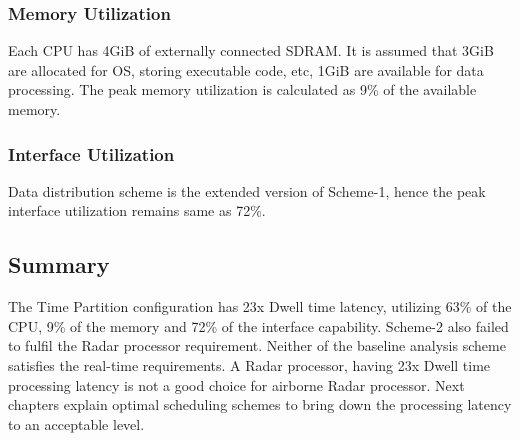 \subsubsection{Memory Utilization}
\label{sss:scheme2:mem_util}
Each CPU has 4GiB of externally connected SDRAM. It is assumed that 3GiB are allocated for OS, storing executable code, etc, 1GiB are available for data processing. The peak memory utilization is calculated as 9\% of the available memory.

\subsubsection{Interface Utilization}
\label{sss:scheme2:interface_util}
Data distribution scheme is the extended version of Scheme-1, hence the peak interface utilization remains same as 72\%.

\subsection{Summary}
\label{sss:scheme2:sar_summary}
The Time Partition configuration has 23x Dwell time latency, utilizing 63\% of the CPU, 9\% of the memory and 72\% of the interface capability. Scheme-2 also failed to fulfil the Radar processor requirement. Neither of the baseline analysis scheme satisfies the real-time requirements. A Radar processor, having 23x Dwell time processing latency is not a good choice for airborne Radar processor. Next chapters explain optimal scheduling schemes to bring down the processing latency to an acceptable level.


